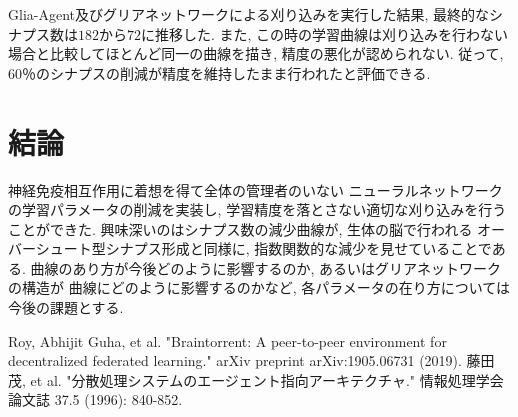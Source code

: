 \documentclass[a4paper, 10.5pt,twocolumn,dvipdfmx]{jsarticle}
\begin{document}
Glia-Agent及びグリアネットワークによる刈り込みを実行した結果, 最終的なシナプス数は$182$から$72$に推移した. 
また, この時の学習曲線は刈り込みを行わない場合と比較してほとんど同一の曲線を描き, 
精度の悪化が認められない.
従って, 60％のシナプスの削減が精度を維持したまま行われたと評価できる.
\section{結論}
神経免疫相互作用に着想を得て全体の管理者のいない
ニューラルネットワークの学習パラメータの削減を実装し, 
学習精度を落とさない適切な刈り込みを行うことができた.
興味深いのはシナプス数の減少曲線が, 生体の脳で行われる
オーバーシュート型シナプス形成と同様に, 
指数関数的な減少を見せていることである. 
曲線のあり方が今後どのように影響するのか, 
あるいはグリアネットワークの構造が
曲線にどのように影響するのかなど, 
各パラメータの在り方については今後の課題とする.
 \begin{thebibliography}{99}
  Roy, Abhijit Guha, et al. "Braintorrent: A peer-to-peer environment for decentralized federated learning." arXiv preprint arXiv:1905.06731 (2019).
  藤田茂, et al. "分散処理システムのエージェント指向アーキテクチャ." 情報処理学会論文誌 37.5 (1996): 840-852.
\end{thebibliography}
 
\end{document}
